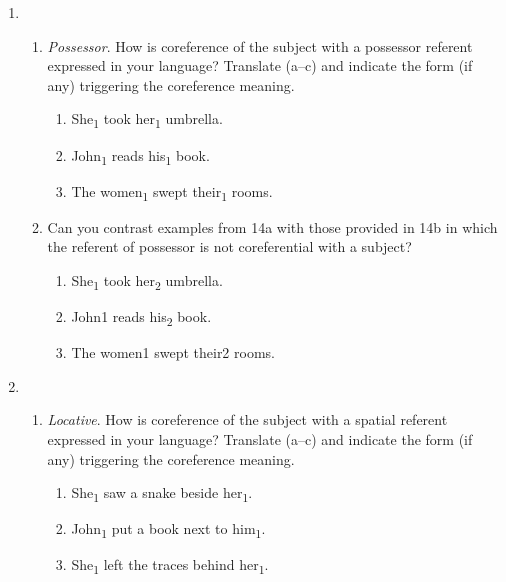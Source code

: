 \documentclass[output=paper]{langscibook}
\begin{document}
\begin{enumerate}[resume]
\item 
\begin{enumerate}[label=(\alph*)]
\item \textit{Possessor}. How is coreference of the subject with a possessor referent expressed in your language? Translate (a--c) and indicate the form (if any) triggering the coreference meaning. 
    \begin{enumerate}[label=\alph*.]
    \item She\textsubscript{1} took her\textsubscript{1} umbrella. 
    \item John\textsubscript{1} reads his\textsubscript{1} book. 
    \item The women\textsubscript{1} swept their\textsubscript{1} rooms. 
    \end{enumerate}
\item  \begin{sloppypar}Can you contrast examples from {14a} with those provided in {14b} in which the referent of possessor is not coreferential with a subject?\end{sloppypar}


   \begin{enumerate}[label=\alph*.]
    \item She\textsubscript{1} took her\textsubscript{2} umbrella. 
    \item John1 reads his\textsubscript{2} book. 
    \item The women1 swept their2 rooms. 
    \end{enumerate}
\end{enumerate}

\item \begin{enumerate}[label=(\alph*)]
\item \textit{Locative}. How is coreference of the subject with a spatial referent expressed in your language? Translate (a--c) and indicate the form (if any) triggering the coreference meaning. 
    \begin{enumerate}[label=\alph*.]
    \item She\textsubscript{1} saw a snake beside her\textsubscript{1}. 
    \item John\textsubscript{1} put a book next to him\textsubscript{1}. 
    \item She\textsubscript{1} left the traces behind her\textsubscript{1}. 
    \end{enumerate}


\end{enumerate}
\end{enumerate}
\end{document}
